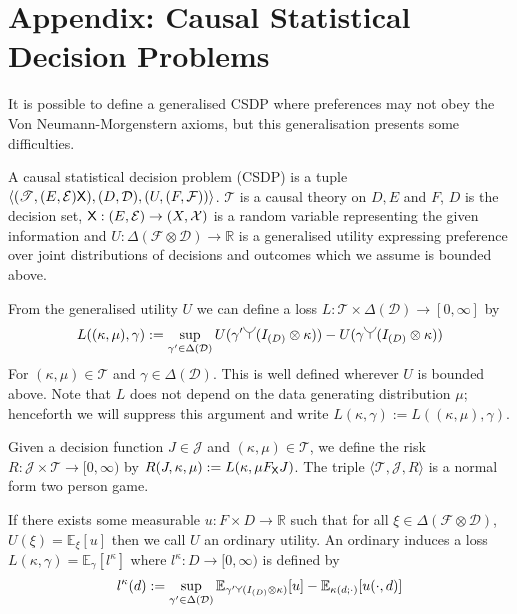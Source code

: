 \section{Appendix: Causal Statistical Decision Problems}\label{app:csdps}

It is possible to define a generalised CSDP where preferences may not obey the Von Neumann-Morgenstern axioms, but this generalisation presents some difficulties.

\begin{definition}\label{def:gen_CSDP}
A causal statistical decision problem (CSDP) is a tuple $\langle (\mathscr{T}, (E,\mathcal{E}) \mathsf{X}), (D,\mathcal{D}), (U,(F,\mathcal{F})) \rangle$. $\mathscr{T}$ is a causal theory on $D, E$ and $F$, $D$ is the decision set, $\mathsf{X}:(E,\mathcal{E})\to (X,\mathcal{X})$ is a random variable representing the given information and $U:\Delta(\mathcal{F}\otimes \mathcal{D})\to \mathbb{R}$ is a generalised utility expressing preference over joint distributions of decisions and outcomes which we assume is bounded above.

From the generalised utility $U$ we can define a loss $L:\mathscr{T}\times\Delta(\mathcal{D})\to [0,\infty]$ by
\begin{align}
    L((\kappa,\mu),\gamma) := \sup_{\gamma'\in\Delta(\mathcal{D})} U(\gamma'\splitter{0.15}(I_{(D)}\otimes \kappa)) - U(\gamma\splitter{0.15}(I_{(D)}\otimes \kappa))\label{eq:canonical_loss}
\end{align}
For $(\kappa,\mu)\in \mathscr{T}$ and $\gamma\in \Delta(\mathcal{D})$. This is well defined wherever $U$ is bounded above. Note that $L$ does not depend on the data generating distribution $\mu$; henceforth we will suppress this argument and write $L(\kappa,\gamma):= L((\kappa,\mu),\gamma)$.

Given a decision function $J\in\mathscr{J}$ and $(\kappa,\mu)\in \mathscr{T}$, we define the risk $R:\mathscr{J}\times \mathscr{T}\to [0,\infty)$ by $R(J,\kappa,\mu) := L(\kappa,\mu F_{\mathsf{X}} J)$. The triple $\langle \mathscr{T}, \mathscr{J}, R\rangle$ is a normal form two person game.

If there exists some measurable $u:F\times D\to \mathbb{R}$ such that for all $\xi\in \Delta(\mathcal{F}\otimes\mathcal{D})$, $U(\xi)=\mathbb{E}_{\xi}[u]$ then we call $U$ an ordinary utility. An ordinary  induces a loss $L(\kappa,\gamma) = \mathbb{E}_{\gamma}[l^\kappa]$ where $l^\kappa:D\to [0,\infty)$ is defined by
\begin{align}
    l^\kappa(d) := \sup_{\gamma'\in \Delta(\mathcal{D})} \mathbb{E}_{\gamma'\splitter{0.08}(I_{(D)}\otimes \kappa)}[u] - \mathbb{E}_{\kappa(d;\cdot)}[u(\cdot,d)]\label{eq:induced_l}
\end{align}
\end{definition}


